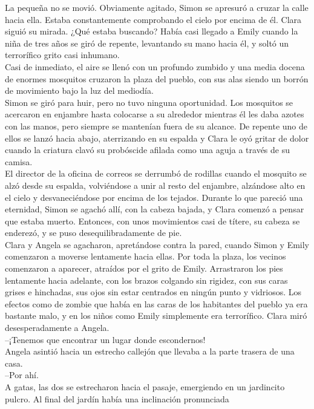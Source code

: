 La pequeña no se movió. Obviamente agitado, Simon se apresuró a cruzar
la calle hacia ella. Estaba constantemente comprobando el cielo por
encima de él. Clara siguió su mirada. ¿Qué estaba buscando? Había casi
llegado a Emily cuando la niña de tres años se giró de repente,
levantando su mano hacia él, y soltó un terrorífico grito casi
inhumano.\\
Casi de inmediato, el aire se llenó con un profundo zumbido y una media
docena de enormes mosquitos cruzaron la plaza del pueblo, con sus alas
siendo un borrón de movimiento bajo la luz del mediodía.\\
Simon se giró para huir, pero no tuvo ninguna oportunidad. Los mosquitos
se acercaron en enjambre hasta colocarse a su alrededor mientras él les
daba azotes con las manos, pero siempre se mantenían fuera de su
alcance. De repente uno de ellos se lanzó hacia abajo, aterrizando en su
espalda y Clara le oyó gritar de dolor cuando la criatura clavó su
probóscide afilada como una aguja a través de su camisa.\\
El director de la oficina de correos se derrumbó de rodillas cuando el
mosquito se alzó desde su espalda, volviéndose a unir al resto del
enjambre, alzándose alto en el cielo y desvaneciéndose por encima de los
tejados. Durante lo que pareció una eternidad, Simon se agachó allí, con
la cabeza bajada, y Clara comenzó a pensar que estaba muerto. Entonces,
con unos movimientos casi de títere, su cabeza se enderezó, y se puso
desequilibradamente de pie.\\
Clara y Angela se agacharon, apretándose contra la pared, cuando Simon y
Emily comenzaron a moverse lentamente hacia ellas. Por toda la plaza,
los vecinos comenzaron a aparecer, atraídos por el grito de Emily.
Arrastraron los pies lentamente hacia adelante, con los brazos colgando
sin rigidez, con sus caras grises e hinchadas, sus ojos sin estar
centrados en ningún punto y vidriosos. Los efectos como de zombie que
había en las caras de los habitantes del pueblo ya era bastante malo, y
en los niños como Emily simplemente era terrorífico. Clara miró
desesperadamente a Angela.\\
--¡Tenemos que encontrar un lugar donde escondernos!\\
Angela asintió hacia un estrecho callejón que llevaba a la parte trasera
de una casa.\\
--Por ahí.\\
A gatas, las dos se estrecharon hacia el pasaje, emergiendo en un
jardincito pulcro. Al final del jardín había una inclinación pronunciada
